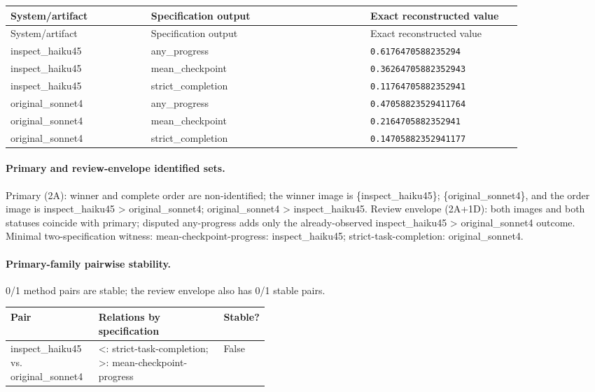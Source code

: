 \begingroup
\scriptsize
\begin{longtable}{@{}p{0.25\linewidth}p{0.39\linewidth}p{0.27\linewidth}@{}}
\toprule
System/artifact & Specification output & Exact reconstructed value \\
\midrule
\endfirsthead
\toprule System/artifact & Specification output & Exact reconstructed value \\
\midrule
\endhead
inspect\_haiku45 & any\_progress & \texttt{0.6176470588235294} \\
inspect\_haiku45 & mean\_checkpoint & \texttt{0.36264705882352943} \\
inspect\_haiku45 & strict\_completion & \texttt{0.11764705882352941} \\
original\_sonnet4 & any\_progress & \texttt{0.47058823529411764} \\
original\_sonnet4 & mean\_checkpoint & \texttt{0.2164705882352941} \\
original\_sonnet4 & strict\_completion & \texttt{0.14705882352941177} \\
\bottomrule
\end{longtable}
\endgroup

\paragraph{Primary and review-envelope identified sets.} Primary (2A): winner and complete order are non-identified; the winner image is \{inspect\_haiku45\}; \{original\_sonnet4\}, and the order image is inspect\_haiku45 > original\_sonnet4; original\_sonnet4 > inspect\_haiku45. Review envelope (2A+1D): both images and both statuses coincide with primary; disputed any-progress adds only the already-observed inspect\_haiku45 > original\_sonnet4 outcome. Minimal two-specification witness: mean-checkpoint-progress: inspect\_haiku45; strict-task-completion: original\_sonnet4.

\paragraph{Primary-family pairwise stability.} 0/1 method pairs are stable; the review envelope also has 0/1 stable pairs.
\begin{center}\scriptsize
\begin{tabularx}{\linewidth}{@{}p{0.34\linewidth}Xp{0.09\linewidth}@{}}
\toprule Pair & Relations by specification & Stable? \\
\midrule
inspect\_haiku45 vs. original\_sonnet4 & <: strict-task-completion; >: mean-checkpoint-progress & False \\
\bottomrule\end{tabularx}\end{center}

